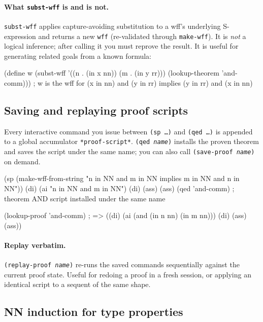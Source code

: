 \paragraph{What \texttt{subst-wff} is and is not.}
\texttt{subst-wff} applies capture-avoiding substitution to a wff's
underlying S-expression and returns a new \texttt{wff} (re-validated
through \texttt{make-wff}).  It is \emph{not} a logical inference;
after calling it you must reprove the result.  It is useful for
generating related goals from a known formula:

\begin{VNBcode}
(define w
  (subst-wff '((n . (in x nn)) (m . (in y rr)))
             (lookup-theorem 'and-comm)))
; w is the wff for (x in nn) and (y in rr) implies (y in rr) and (x in nn)
\end{VNBcode}

\subsection{Saving and replaying proof scripts}
\label{sec:replay}

Every interactive command you issue between \texttt{(sp\ \ldots)} and
\texttt{(qed\ \ldots)} is appended to a global accumulator
\texttt{*proof-script*}.  \texttt{(qed \textit{name})} installs the
proven theorem and saves the script under the same name; you can also
call \texttt{(save-proof \textit{name})} on demand.

\begin{VNBcode}
(sp (make-wff-from-string "n in NN and m in NN implies m in NN and n in NN"))
(di) (ai "n in NN and m in NN") (di) (ass) (ass)
(qed 'and-comm)
; theorem AND script installed under the same name

(lookup-proof 'and-comm)
; => ((di) (ai (and (in n nn) (in m nn))) (di) (ass) (ass))
\end{VNBcode}

\paragraph{Replay verbatim.}
\texttt{(replay-proof \textit{name})} re-runs the saved commands
sequentially against the current proof state.  Useful for redoing a
proof in a fresh session, or applying an identical script to a sequent
of the same shape.

\subsection{NN induction for type properties}
\label{sec:ex-ni-type}

